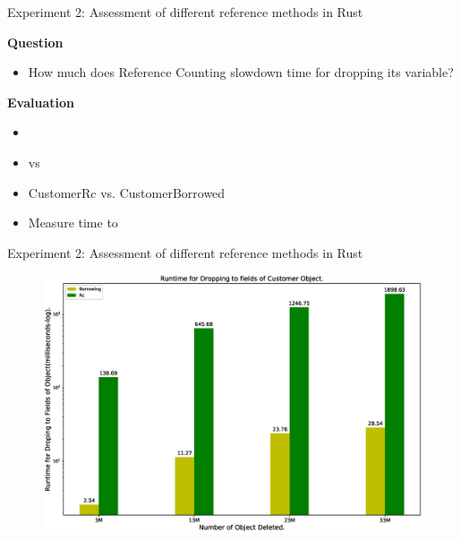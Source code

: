 \documentclass[9pt]{beamer}
\begin{document}

\begin{frame}[fragile]{Experiment 2: Assessment of different reference methods in Rust}

    \textbf{Question}
    \begin{itemize}
        \item How much does Reference Counting slowdown time for dropping its variable?
    \end{itemize}

    \vspace{0.5cm}

    \textbf{Evaluation}
    \begin{itemize}
        \item {}
        \item {} vs 
        \item CustomerRc vs. CustomerBorrowed
        \item Measure time to 
    \end{itemize}

\end{frame}



\begin{frame}[fragile]{Experiment 2: Assessment of different reference methods in Rust}

    \begin{figure}[hp]
        \centering
        \begin{center}
                \includegraphics[width=1\textwidth]{images/rust_droptime_borring_rc.eps}
                \captionsetup{labelformat=empty}
        \end{center}
    \end{figure}
\end{frame}
\end{document}
